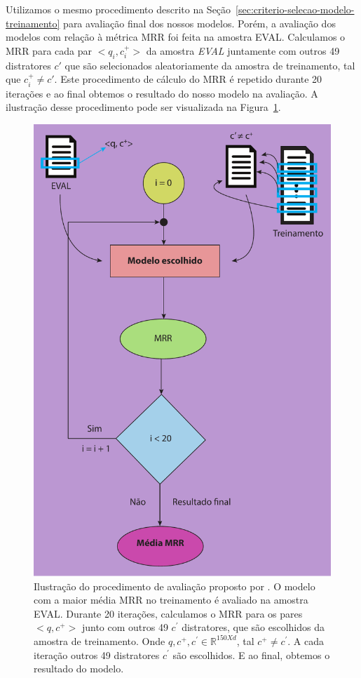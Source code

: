 Utilizamos o mesmo procedimento descrito na Seção~\ref{sec:criterio-selecao-modelo-treinamento} para avaliação final dos nossos modelos. Porém, a avaliação dos modelos com relação à métrica MRR foi feita na amostra EVAL. Calculamos o MRR para cada par $<q_{i}, c_{i}^{+}>$ da amostra \emph{EVAL} juntamente com outros 49 distratores $c'$ que são selecionados aleatoriamente da amostra de treinamento, tal que $c_{i}^{+} \neq c'$. Este procedimento de cálculo do MRR é repetido durante 20 iterações e ao final obtemos o resultado do nosso modelo na avaliação. A ilustração desse procedimento pode ser visualizada na Figura~\ref{fig:final-evaluation-process}.

\begin{figure}[h]
\centering
\includegraphics[height=1\textwidth]{figuras/cap-experimento/final_evaluation_process.pdf}
\caption[Ilustração do procedimento de avaliação proposto por \cite{iyer-etal-2016-summarizing}.]{Ilustração do procedimento de avaliação proposto por \cite{iyer-etal-2016-summarizing}. O modelo com a maior média MRR no treinamento é avaliado na amostra EVAL. Durante 20 iterações, calculamos o MRR para os pares $<q, c^{+}>$ junto com outros 49 $c^{'}$ distratores, que são escolhidos da amostra de treinamento. Onde $q, c^{+}, c^{'} \in \mathbb{R}^{150 X d}$, tal $c^{+} \neq c^{'}$. A cada iteração outros 49 distratores $c^{'}$ são escolhidos. E ao final, obtemos o resultado do modelo.}
\label{fig:final-evaluation-process}
\end{figure}



